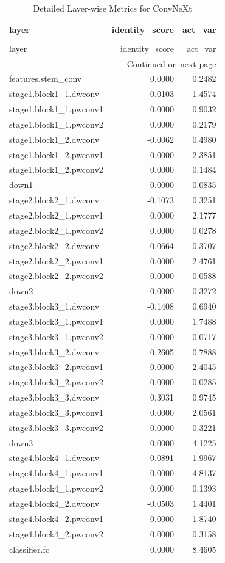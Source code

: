 \begin{longtable}{lrr}
\caption{Detailed Layer-wise Metrics for ConvNeXt} \label{tab:layer_metrics_convnext} \\
\toprule
layer & identity_score & act_var \\
\midrule
\endfirsthead
\caption[]{Detailed Layer-wise Metrics for ConvNeXt} \\
\toprule
layer & identity_score & act_var \\
\midrule
\endhead
\midrule
\multicolumn{3}{r}{Continued on next page} \\
\midrule
\endfoot
\bottomrule
\endlastfoot
features.stem_conv & 0.0000 & 0.2482 \\
stage1.block1_1.dwconv & -0.0103 & 1.4574 \\
stage1.block1_1.pwconv1 & 0.0000 & 0.9032 \\
stage1.block1_1.pwconv2 & 0.0000 & 0.2179 \\
stage1.block1_2.dwconv & -0.0062 & 0.4980 \\
stage1.block1_2.pwconv1 & 0.0000 & 2.3851 \\
stage1.block1_2.pwconv2 & 0.0000 & 0.1484 \\
down1 & 0.0000 & 0.0835 \\
stage2.block2_1.dwconv & -0.1073 & 0.3251 \\
stage2.block2_1.pwconv1 & 0.0000 & 2.1777 \\
stage2.block2_1.pwconv2 & 0.0000 & 0.0278 \\
stage2.block2_2.dwconv & -0.0664 & 0.3707 \\
stage2.block2_2.pwconv1 & 0.0000 & 2.4761 \\
stage2.block2_2.pwconv2 & 0.0000 & 0.0588 \\
down2 & 0.0000 & 0.3272 \\
stage3.block3_1.dwconv & -0.1408 & 0.6940 \\
stage3.block3_1.pwconv1 & 0.0000 & 1.7488 \\
stage3.block3_1.pwconv2 & 0.0000 & 0.0717 \\
stage3.block3_2.dwconv & 0.2605 & 0.7888 \\
stage3.block3_2.pwconv1 & 0.0000 & 2.4045 \\
stage3.block3_2.pwconv2 & 0.0000 & 0.0285 \\
stage3.block3_3.dwconv & 0.3031 & 0.9745 \\
stage3.block3_3.pwconv1 & 0.0000 & 2.0561 \\
stage3.block3_3.pwconv2 & 0.0000 & 0.3221 \\
down3 & 0.0000 & 4.1225 \\
stage4.block4_1.dwconv & 0.0891 & 1.9967 \\
stage4.block4_1.pwconv1 & 0.0000 & 4.8137 \\
stage4.block4_1.pwconv2 & 0.0000 & 0.1393 \\
stage4.block4_2.dwconv & -0.0503 & 1.4401 \\
stage4.block4_2.pwconv1 & 0.0000 & 1.8740 \\
stage4.block4_2.pwconv2 & 0.0000 & 0.3158 \\
classifier.fc & 0.0000 & 8.4605 \\
\end{longtable}
